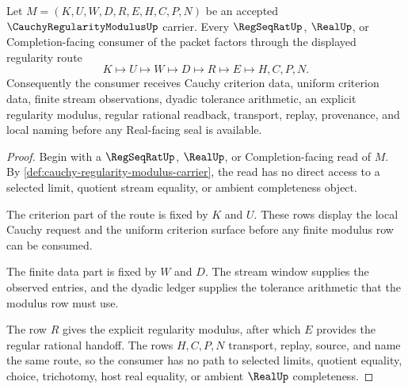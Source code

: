 \begin{theorem}
\label{thm:cauchy-regularity-modulus-regseqrat-handoff}
Let $M=(K,U,W,D,R,E,H,C,P,N)$ be an accepted $\CauchyRegularityModulusUp$ carrier. Every $\RegSeqRatUp$, $\RealUp$, or Completion-facing consumer of the packet factors through the displayed regularity route
$$
K \longmapsto U \longmapsto W \longmapsto D \longmapsto R \longmapsto E \longmapsto H,C,P,N .
$$
Consequently the consumer receives Cauchy criterion data, uniform criterion data, finite stream observations, dyadic tolerance arithmetic, an explicit regularity modulus, regular rational readback, transport, replay, provenance, and local naming before any Real-facing seal is available.
\end{theorem}
\begin{proof}
Begin with a $\RegSeqRatUp$, $\RealUp$, or Completion-facing read of $M$. By \autoref{def:cauchy-regularity-modulus-carrier}, the read has no direct access to a selected limit, quotient stream equality, or ambient completeness object.

The criterion part of the route is fixed by $K$ and $U$. These rows display the local Cauchy request and the uniform criterion surface before any finite modulus row can be consumed.

The finite data part is fixed by $W$ and $D$. The stream window supplies the observed entries, and the dyadic ledger supplies the tolerance arithmetic that the modulus row must use.

The row $R$ gives the explicit regularity modulus, after which $E$ provides the regular rational handoff. The rows $H,C,P,N$ transport, replay, source, and name the same route, so the consumer has no path to selected limits, quotient equality, choice, trichotomy, host real equality, or ambient $\RealUp$ completeness.
\end{proof}



